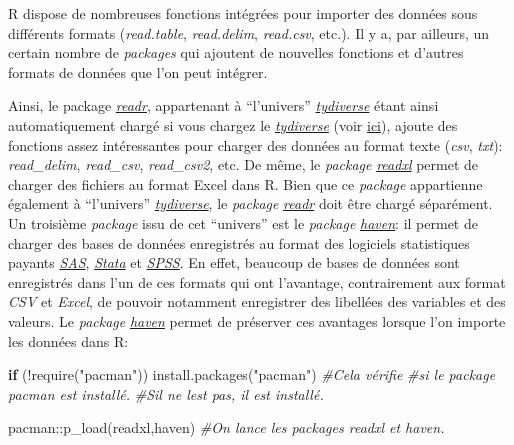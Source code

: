 \documentclass[
]{book}
\newenvironment{Shaded}{\begin{snugshade}}{\end{snugshade}}
\newcommand{\CommentTok}[1]{\textcolor[rgb]{0.56,0.35,0.01}{\textit{#1}}}
\newcommand{\ControlFlowTok}[1]{\textcolor[rgb]{0.13,0.29,0.53}{\textbf{#1}}}
\newcommand{\FunctionTok}[1]{\textcolor[rgb]{0.00,0.00,0.00}{#1}}
\newcommand{\NormalTok}[1]{#1}
\newcommand{\SpecialCharTok}[1]{\textcolor[rgb]{0.00,0.00,0.00}{#1}}
\newcommand{\StringTok}[1]{\textcolor[rgb]{0.31,0.60,0.02}{#1}}
\begin{document}
R dispose de nombreuses fonctions intégrées pour importer des données sous différents formats (\emph{read.table}, \emph{read.delim}, \emph{read.csv}, etc.). Il y a, par ailleurs, un certain nombre de \emph{packages} qui ajoutent de nouvelles fonctions et d'autres formats de données que l'on peut intégrer.

Ainsi, le package \href{https://readr.tidyverse.org/}{\emph{readr}}, appartenant à ``l'univers'' \href{https://www.tidyverse.org/}{\emph{tydiverse}} étant ainsi automatiquement chargé si vous chargez le \href{https://www.tidyverse.org/}{\emph{tydiverse}} (voir \protect\hyperlink{packages}{ici}), ajoute des fonctions assez intéressantes pour charger des données au format texte (\emph{csv}, \emph{txt}): \emph{read\_delim}, \emph{read\_csv}, \emph{read\_csv2}, etc. De même, le \emph{package} \href{https://readxl.tidyverse.org/}{\emph{readxl}} permet de charger des fichiers au format Excel dans R. Bien que ce \emph{package} appartienne également à ``l'univers'' \href{https://www.tidyverse.org/}{\emph{tydiverse}}, le \emph{package} \href{https://readr.tidyverse.org/}{\emph{readr}} doit être chargé séparément. Un troisième \emph{package} issu de cet ``univers'' est le \emph{package} \href{https://haven.tidyverse.org/}{\emph{haven}}: il permet de charger des bases de données enregistrés au format des logiciels statistiques payants \href{https://www.sas.com/}{\emph{SAS}}, \href{https://www.stata.com/}{\emph{Stata}} et \href{https://www.ibm.com/fr-fr/products/spss-statistics}{\emph{SPSS}}. En effet, beaucoup de bases de données sont enregistrés dans l'un de ces formats qui ont l'avantage, contrairement aux format \emph{CSV} et \emph{Excel}, de pouvoir notamment enregistrer des libellées des variables et des valeurs. Le \emph{package} \href{https://haven.tidyverse.org/}{\emph{haven}} permet de préserver ces avantages lorsque l'on importe les données dans R:

\begin{Shaded}
\begin{Highlighting}[]
\ControlFlowTok{if}\NormalTok{ (}\SpecialCharTok{!}\FunctionTok{require}\NormalTok{(}\StringTok{"pacman"}\NormalTok{)) }\FunctionTok{install.packages}\NormalTok{(}\StringTok{"pacman"}\NormalTok{) }\CommentTok{\#Cela vérifie}
                             \CommentTok{\#si le package pacman est installé.}
                             \CommentTok{\#S\textquotesingle{}il ne l\textquotesingle{}est pas, il est installé.}

\NormalTok{pacman}\SpecialCharTok{::}\FunctionTok{p\_load}\NormalTok{(readxl,haven) }\CommentTok{\#On lance les packages readxl et haven.}
\end{Highlighting}
\end{Shaded}
\end{document}
